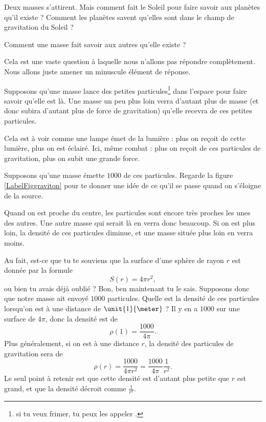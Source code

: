 \begin{pourquoidonc}
	Deux masses s'attirent. Mais comment fait le Soleil pour faire savoir aux planètes qu'il existe ? Comment les planètes savent qu'elles sont dans le champ de gravitation du Soleil ?

	Comment une masse fait savoir aux autres qu'elle existe ?
\end{pourquoidonc}
Cela est une vaste question à laquelle nous n'allons pas répondre complètement. Nous allons juste amener un minuscule élément de réponse. 

Supposons qu'une masse lance des petites particules\footnote{si tu veux frimer, tu peux les appeler .} dans l'espace pour faire savoir qu'elle est là. Une masse un peu plus loin \og verra\fg{} d'autant plus de masse (et donc subira d'autant plus de force de gravitation) qu'elle recevra de ces petites particules.

Cela est à voir comme une lampe émet de la lumière : plus on reçoit de cette lumière, plus on est éclairé. Ici, même combat : plus on reçoit de ces particules de gravitation, plus on subit une grande force.

Supposons qu'une masse émette $1000$ de ces particules. Regarde la figure \ref{LabelFiggraviton} pour te donner une idée de ce qu'il se passe quand on s'éloigne de la source.
\newcommand{\CaptionFiggraviton}{Les petites particules de gravitation. Plus on s'éloigne, plus elles s'espacent les unes des autres}


Quand on est proche du centre, les particules sont encore très proches les unes des autres. Une autre masse qui serait là en verra donc beaucoup. Si on est plus loin, la densité de ces particules diminue, et une masse située plus loin en verra moins. 

Au fait, est-ce que tu te souviens que la surface d'une sphère de rayon $r$ est donnée par la formule
\begin{equation}
	S(r)=4\pi r^2,
\end{equation}
ou bien tu avais déjà oublié ? Bon, ben maintenant tu le sais. Supposons donc que notre masse ait envoyé $1000$ particules. Quelle est la densité de ces particules lorsqu'on est à une distance de $\unit{1}{\meter}$ ? Il y en a $1000$ sur une surface de $4\pi$, donc la densité est de
\begin{equation}
	\rho(1)=\frac{ 1000 }{ 4\pi }.
\end{equation}
Plus généralement, si on est à une distance $r$, la densité des particules de gravitation sera de 
\begin{equation}
	\rho(r)=\frac{ 1000 }{ 4\pi r^2 }=\frac{ 1000 }{ 4\pi }\frac{1}{ r^2 }.
\end{equation}
Le seul point à retenir est que cette densité est d'autant plus petite que $r$ est grand, et que la densité décroit comme $\frac{1}{ r^2 }$.

